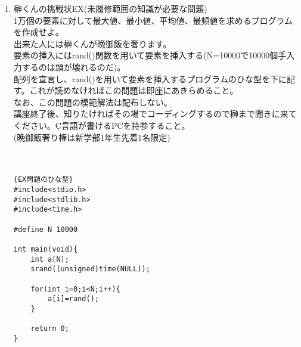 \documentclass[a4j,titlepage,dvipdfmx]{jsarticle}   %
\begin{document}
\begin{enumerate}
\\
int型の整数a,b,cが与えられます。\\
\begin{verbatim}
a+b=cならば "SAINO\n",
a-b=cならば "もっちゃん\n",
a*b=cならば "ロブジェ\n",
bが0でなく,さらにa/b=cならば "チャイナ\n",
\end{verbatim}
と出力せよ。なお、a/b において、aもbも整数型ならばその小数点以下は切り捨てられるという仕様もこの機会に認識すること。\\
例えば、a=4,b=3,c=1の時は"もっちゃん"と"チャイナ"が出力される。\\
\\
\\
問題が簡単すぎてつまらない、もうC言語の基本文法は理解してるわボケェ、という人へ\\
\\
*この問題は、現在までの講座内容では解くことが不可能です。進んで勉強をしている人のために作りました。\\
*具体的には、まだ習っていない繰り返し文,条件分岐,配列の知識が必要不可欠です。\\
\item 榊くんの挑戦状EX(未履修範囲の知識が必要な問題)\\
1万個の要素に対して最大値、最小値、平均値、最頻値を求めるプログラムを作成せよ。\\
出来た人には榊くんが晩御飯を奢ります。\\
要素の挿入にはrand()関数を用いて要素を挿入する(N=10000で10000個手入力するのは頭が壊れるのだ)。\\
配列を宣言し、rand()を用いて要素を挿入するプログラムのひな型を下に記す。これが読めなければこの問題は即座にあきらめること。\\
なお、この問題の模範解法は配布しない。\\
講座終了後、知りたければその場でコーディングするので榊まで聞きに来てください。C言語が書けるPCを持参すること。\\
(晩御飯奢り権は新学部1年生先着1名限定)\\
\\
\\
\begin{lstlisting}{EX問題のひな型}
#include<stdio.h>
#include<stdlib.h>
#include<time.h>

#define N 10000

int main(void){
	int a[N];
	srand((unsigned)time(NULL));
	
	for(int i=0;i<N;i++){
		a[i]=rand();
	}
	
	return 0;
}
\end{lstlisting}

\end{enumerate}
\end{document}
